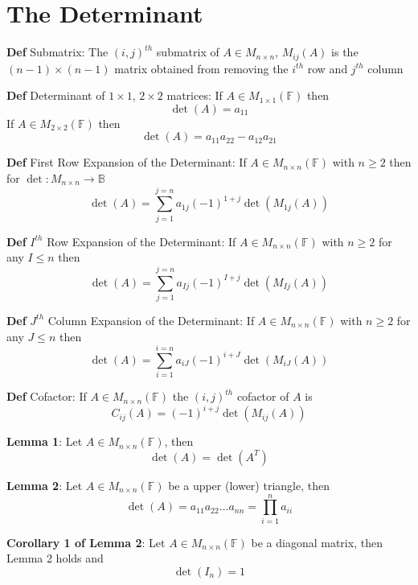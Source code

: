 \documentclass[11pt,notitlepage]{report}
\newcommand{\bb}[1]{\ensuremath{\mathbb{#1}}}
\begin{document}
\section{The Determinant}

\textbf{Def} Submatrix: The $(i ,j)^{th}$ submatrix of $A \in M_{n \times n}$, $M_{ij}(A)$ is the $(n - 1) \times (n - 1)$ matrix obtained from removing the $i^{th}$ row and $j^{th}$ column

\textbf{Def} Determinant of $1 \times 1$, $2 \times 2$ matrices: If $A \in M_{1 \times 1}(\bb F)$ then $$\det(A) = a_{11}$$
If $A \in M_{2 \times 2}(\bb F)$ then $$\det(A) = a_{11}a_{22} - a_{12}a_{21}$$

\textbf{Def} First Row Expansion of the Determinant: If $A \in M_{n \times n}(\bb F)$  with $n \geq 2$ then for $\det : M_{n \times n} \rightarrow \bb B$
$$\det(A) = \sum_{j = 1}^{j = n} a_{1j}(-1)^{1+j}\det(M_{1j}(A))$$

\textbf{Def} $I^{th}$ Row Expansion of the Determinant: If $A \in M_{n \times n}(\bb F)$  with $n \geq 2$ for any $I\leq n$ then
$$\det(A) = \sum_{j = 1}^{j = n} a_{Ij}(-1)^{I+j}\det(M_{Ij}(A))$$

\textbf{Def} $J^{th}$ Column Expansion of the Determinant: If $A \in M_{n \times n}(\bb F)$  with $n \geq 2$ for any $J\leq n$ then
$$\det(A) = \sum_{i = 1}^{i = n} a_{iJ}(-1)^{i+J}\det(M_{iJ}(A))$$

\textbf{Def} Cofactor: If $A \in M_{n \times n}(\bb F)$ the $(i, j)^{th}$ cofactor of $A$ is
$$C_{ij}(A) = (-1)^{i+j} \det(M_{ij}(A))$$

\textbf{Lemma 1}: Let $A \in M_{n \times n}(\bb F)$, then
$$\det(A) = \det(A^T)$$

\textbf{Lemma 2}: Let $A \in M_{n \times n}(\bb F)$ be a upper (lower) triangle, then
$$\det(A) = a_{11}a_{22}\dots a_{nn} = \prod_{i = 1}^n a_{ii}$$

\textbf{Corollary 1 of Lemma 2}: Let $A \in M_{n \times n}(\bb F)$ be a diagonal matrix, then Lemma 2 holds and
$$\det(I_n) = 1$$
\end{document}
